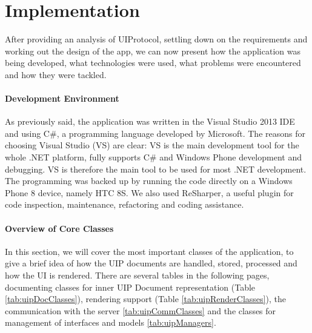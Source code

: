 \chapter{Implementation}
After providing an analysis of UIProtocol, settling down on the requirements and working out the design of the app, we can now present how the application was being developed, what technologies were used, what problems were encountered and how they were tackled.

\subsubsection{Development Environment}
As previously said, the application was written in the Visual Studio 2013 IDE and using C\#, a programming language developed by Microsoft. The reasons for choosing Visual Studio (VS) are clear: VS is the main development tool for the whole .NET platform, fully supports C\# and Windows Phone development and debugging. VS is therefore the main tool to be used for most .NET development.\\The programming was backed up by running the code directly on a Windows Phone 8 device, namely HTC 8S. We also used ReSharper, a useful plugin for code inspection, maintenance, refactoring and coding assistance.

\subsubsection{Overview of Core Classes}
In this section, we will cover the most important classes of the application, to give a brief idea of how the UIP documents are handled, stored, processed and how the UI is rendered. There are several tables in the following pages, documenting classes for inner UIP Document representation (Table \ref{tab:uipDocClasses}), rendering support (Table \ref{tab:uipRenderClasses}), the communication with the server \ref{tab:uipCommClasses} and the classes for management of interfaces and models \ref{tab:uipManagers}.










